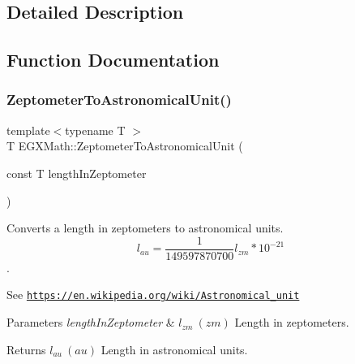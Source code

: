 \subsection{Detailed Description}


\subsection{Function Documentation}
\mbox{\label{group___e_g_x_math-_conversions-_length_conversions-_zeptometer-_astronomical_ga01bceda59fbfc5414c72ccba254b365c}} 
\subsubsection{\texorpdfstring{Zeptometer\+To\+Astronomical\+Unit()}{ZeptometerToAstronomicalUnit()}}
{\footnotesize\ttfamily template$<$typename T $>$ \\
T E\+G\+X\+Math\+::\+Zeptometer\+To\+Astronomical\+Unit (\begin{DoxyParamCaption}\item[{const T}]{length\+In\+Zeptometer }\end{DoxyParamCaption})}



Converts a length in zeptometers to astronomical units. \[ l_{au}= \frac{1}{149597870700} l_{zm} * 10^{-21} \]. 

See \href{https://en.wikipedia.org/wiki/Astronomical_unit}{\tt https\+://en.\+wikipedia.\+org/wiki/\+Astronomical\+\_\+unit} 
\begin{DoxyParams}{Parameters}
{\em length\+In\+Zeptometer} & $ l_{zm}\ (zm)$ Length in zeptometers. \\
\hline
\end{DoxyParams}
\begin{DoxyReturn}{Returns}
$ l_{au}\ (au)$ Length in astronomical units. 
\end{DoxyReturn}
\mbox{\label{group___e_g_x_math-_conversions-_length_conversions-_zeptometer-_astronomical_gaadccc6ef68b9d71b37be40ffbb845843}} 
